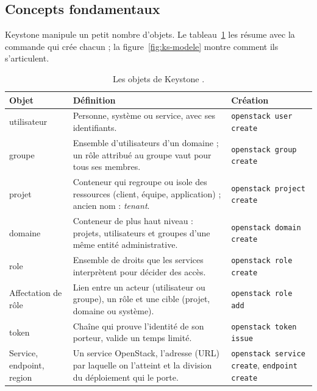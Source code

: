 \subsection{Concepts fondamentaux}\label{sec:ks-concepts}

Keystone manipule un petit nombre d'objets. Le tableau~\ref{tab:ks-objets} les résume avec la commande
qui crée chacun ; la figure~\ref{fig:ks-modele} montre comment ils s'articulent.

\begin{table}[!ht]
\centering
\renewcommand{\arraystretch}{1.25}
\begin{tabular}{@{}>{\raggedright\arraybackslash}p{2.9cm}p{7.9cm}>{\raggedright\arraybackslash}p{4.7cm}@{}}
\toprule
\textbf{Objet} & \textbf{Définition} & \textbf{Création} \\
\midrule
\Gls{utilisateur} & Personne, système ou service, avec ses identifiants. & \texttt{openstack user create} \\
\Gls{groupe} & Ensemble d'utilisateurs d'un domaine ; un rôle attribué au groupe vaut pour tous
  ses membres. & \texttt{openstack group create} \\
\Gls{projet} & Conteneur qui regroupe ou isole des ressources (client, équipe, application) ;
  ancien nom : \emph{tenant}. & \texttt{openstack project create} \\
\Gls{domaine} & Conteneur de plus haut niveau : projets, utilisateurs et groupes d'une même entité
  administrative. & \texttt{openstack domain create} \\
\Gls{role} & Ensemble de droits que les services interprètent pour décider des accès. &
  \texttt{openstack role create} \\
Affectation de rôle & Lien entre un acteur (utilisateur ou groupe), un rôle et une cible (projet,
  domaine ou système). & \texttt{openstack role add} \\
\Gls{token} & Chaîne qui prouve l'identité de son porteur, valide un temps limité. &
  \texttt{openstack token issue} \\
Service, \gls{endpoint}, \gls{region} & Un service OpenStack, l'adresse (URL) par laquelle on l'atteint et la
  division du déploiement qui le porte. & \texttt{openstack service create}, \texttt{endpoint create} \\
\bottomrule
\end{tabular}
\caption{Les objets de Keystone \parencite{keystone-concepts,keystone-services}.}
\label{tab:ks-objets}
\end{table}

